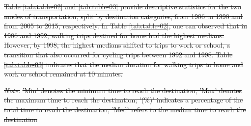\documentclass[Royal,times,sageh]{sagej}
\providecommand{\DIFdeltex}[1]{{\protect\color{red}\sout{#1}}} %
\providecommand{\DIFdelbegin}{} %
\providecommand{\DIFdel}[1]{\texorpdfstring{\DIFdeltex{#1}}{}} %
\begin{document}
\DIFdelbegin \DIFdel{Table \ref{tab:table-02} and \ref{tab:table-03} provide descriptive
statistics for the two modes of transportation, split by destination
categories, from 1986 to 1998 and from 2005 to 2015, respectively. In
Table \ref{tab:table-02}, one can observed that in 1986 and 1992,
walking trips destined for home had the highest medians. However, by
1998, the highest medians shifted to trips to work or school, a
transition that also occurred for cycling trips between 1992 and 1998.
Table \ref{tab:table-03} indicates that the median duration for walking
trips to home and work or school remained at 10 minutes.
}%


\textit{\DIFdel{Note: }} 
\DIFdel{'Min' denotes the minimum time to reach the destination; 'Max' denotes the maximum time to reach the destination; '(\%)' indicates a percentage of the total time to reach the destination; 'Med' refers to the median time to reach the destination
}%
\end{document}
